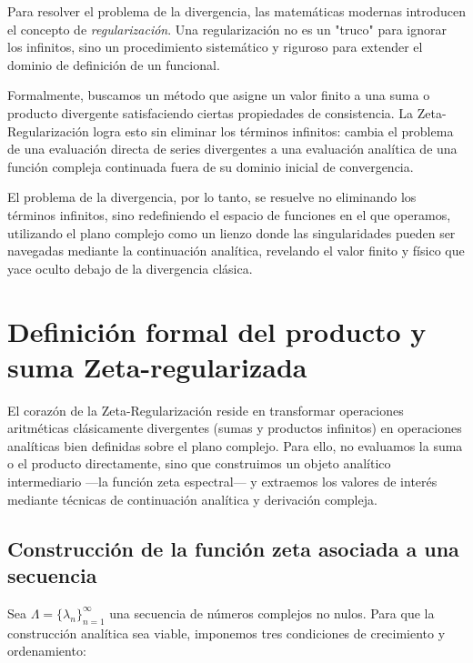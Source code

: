 Para resolver el problema de la divergencia, las matemáticas modernas introducen el concepto de \textit{regularización}. Una regularización no es un "truco" para ignorar los infinitos, sino un procedimiento sistemático y riguroso para extender el dominio de definición de un funcional. 

Formalmente, buscamos un método que asigne un valor finito a una suma o producto divergente satisfaciendo ciertas propiedades de consistencia. La Zeta-Regularización logra esto sin eliminar los términos infinitos: cambia el problema de una evaluación directa de series divergentes a una evaluación analítica de una función compleja continuada fuera de su dominio inicial de convergencia.

El problema de la divergencia, por lo tanto, se resuelve no eliminando los términos infinitos, sino redefiniendo el espacio de funciones en el que operamos, utilizando el plano complejo como un lienzo donde las singularidades pueden ser navegadas mediante la continuación analítica, revelando el valor finito y físico que yace oculto debajo de la divergencia clásica.


\section{Definición formal del producto y suma Zeta-regularizada}

El corazón de la Zeta-Regularización reside en transformar operaciones aritméticas clásicamente divergentes (sumas y productos infinitos) en operaciones analíticas bien definidas sobre el plano complejo. Para ello, no evaluamos la suma o el producto directamente, sino que construimos un objeto analítico intermediario —la función zeta espectral— y extraemos los valores de interés mediante técnicas de continuación analítica y derivación compleja.

\subsection{Construcción de la función zeta asociada a una secuencia}

Sea $\Lambda = \{\lambda_n\}_{n=1}^{\infty}$ una secuencia de números complejos no nulos. Para que la construcción analítica sea viable, imponemos tres condiciones de crecimiento y ordenamiento:

